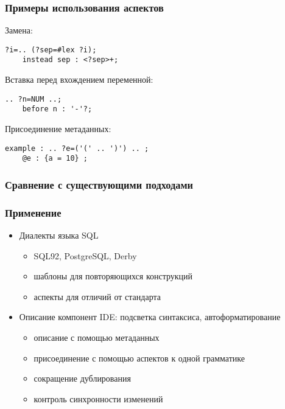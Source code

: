 \documentclass{beamer}
\begin{document}
\begin{frame}[fragile]
	\frametitle{Примеры использования аспектов}
Замена:
\begin{lstlisting}[xleftmargin=0.3cm]
?i=.. (?sep=#lex ?i);
    instead sep : <?sep>+;
\end{lstlisting}
Вставка перед вхождением переменной:
\begin{lstlisting}[xleftmargin=0.3cm]
.. ?n=NUM ..;
    before n : '-'?;
\end{lstlisting}
Присоединение метаданных:
\begin{lstlisting}[xleftmargin=0.3cm]
example : .. ?e=('(' .. ')') .. ;
    @e : {a = 10} ;
\end{lstlisting}
\end{frame}

\begin{frame}[fragile]
	\frametitle{Сравнение с существующими подходами}

\end{frame}

\begin{frame}[fragile]
	\frametitle{Применение}
\begin{itemize}
\item Диалекты языка SQL
	\begin{itemize}
		\item SQL92, PostgreSQL, Derby
		\item шаблоны для повторяющихся конструкций
		\item аспекты для отличий от стандарта
	\end{itemize}
\item Описание компонент IDE: подсветка синтаксиса, автоформатирование
	\begin{itemize}
		\item описание с помощью метаданных
		\item присоединение с помощью аспектов к одной грамматике
		\item сокращение дублирования
		\item контроль синхронности изменений
	\end{itemize}
\end{itemize}	
\end{frame}
\end{document}
